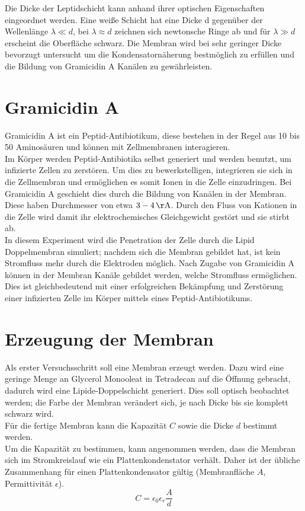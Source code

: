 \documentclass{include/thesisclass3}
\newcommand{\eps}{\epsilon}
\newcommand{\e}[1]{\,\si{#1}}
\begin{document}
Die Dicke der Leptidschicht kann anhand ihrer optischen Eigenschaften eingeordnet werden. Eine weiße Schicht hat eine Dicke d gegenüber der Wellenlänge $\lambda \ll d$, bei $\lambda \approx d$ zeichnen sich newtonsche Ringe ab und für $\lambda \gg d$ erscheint die Oberfläche schwarz. Die Membran wird bei sehr geringer Dicke bevorzugt untersucht um die Kondensatornäherung bestmöglich zu erfüllen und die Bildung von Gramicidin A Kanälen zu gewährleisten.

\section{Gramicidin A}
Gramicidin A ist ein Peptid-Antibiotikum, diese bestehen in der Regel aus 10 bis 50 Aminosäuren und können mit Zellmembranen interagieren.\\
Im Körper werden Peptid-Antibiotika selbst generiert und werden benutzt, um infizierte Zellen zu zerstören.  Um dies zu bewerkstelligen, integrieren sie sich in die Zellmembran und ermöglichen es somit Ionen in die Zelle einzudringen. Bei Gramicidin A geschieht dies durch die Bildung von Kanälen in der Membran. Diese haben Durchmesser von etwa $3 - 4\e{\AA}$. Durch den Fluss von Kationen in die Zelle wird damit ihr elektrochemisches Gleichgewicht gestört und sie stirbt ab.\\
In diesem Experiment wird die Penetration der Zelle durch die Lipid Doppelmembran simuliert; nachdem sich die Membran gebildet hat, ist kein Stromfluss mehr durch die Elektroden möglich. Nach Zugabe von Gramicidin A können in der Membran Kanäle gebildet werden, welche Stromfluss ermöglichen. Dies ist gleichbedeutend mit einer erfolgreichen Bekämpfung und Zerstörung einer infizierten Zelle im Körper mittels eines Peptid-Antibiotikums.




\section{Erzeugung der Membran}
Als erster Versuchsschritt soll eine Membran erzeugt werden. Dazu wird eine geringe Menge an Glycerol Monooleat in Tetradecan auf die Öffnung gebracht, dadurch wird eine Lipide-Doppelschicht generiert. Dies soll optisch beobachtet werden; die Farbe der Membran verändert sich, je nach Dicke bis sie komplett schwarz wird.\\
Für die fertige Membran kann die Kapazität $C$ sowie die Dicke $d$ bestimmt werden.\\Um die Kapazität zu bestimmen, kann angenommen werden, dass die Membran sich im Stromkreislauf wie ein Plattenkondenstator verhält. Daher ist der übliche Zusammenhang für einen Plattenkondensator gültig (Membranfläche $A$, Permittivität $\eps$).
\begin{equation}
C = \eps_0\eps_r \frac{A}{d}
\end{equation}
\end{document}
